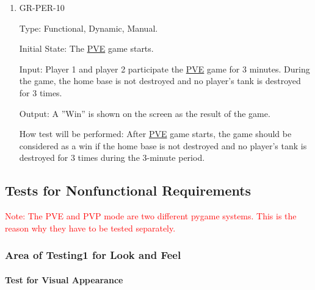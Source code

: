 \documentclass[12pt, titlepage]{article}
\begin{document}
\begin{enumerate}
\item{GR-PER-10\\}

Type: Functional, Dynamic, Manual.
					
Initial State: The \underline{PVE} game starts.
					
Input: Player  1  and  player  2  participate  the  \underline{PVE}  game  for  3 minutes. During the game, the home base is not destroyed and no player’s tank is destroyed for 3 times.
					
Output: A ”Win” is shown on the screen as the result of the game.
					
How test will be performed: After \underline{PVE} game starts, the game should be considered as a win if the home base is not destroyed and no player’s tank is destroyed for 3 times during the 3-minute period. 

\end{enumerate}


\subsection{Tests for Nonfunctional Requirements}
\textcolor{red}{Note: The PVE and PVP mode are two different pygame systems. This is the reason why they have to be tested separately.}
\subsubsection{Area of Testing1 for Look and Feel}
		
\paragraph{Test for Visual Appearance}
\end{document}
